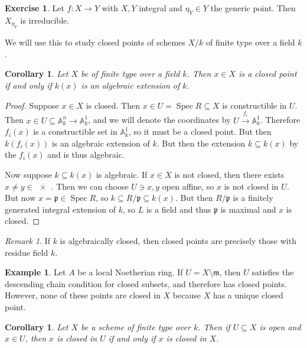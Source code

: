 \documentclass[leqno, openany]{memoir}
\newtheorem{cor}[thm]{Corollary}
\theoremstyle{definition}
\newtheorem{exm}[thm]{Example}
\newtheorem{exer}[thm]{Exercise}
\theoremstyle{remark}
\newtheorem{rmk}[thm]{Remark}
\theoremstyle{plain}
\theoremstyle{definition}
\theoremstyle{remark}
\newcommand{\A}{\mathbb{A}}
\newcommand{\mf}[1]{\mathfrak{#1}}
\newcommand{\ol}[1]{\overline{#1}}
\DeclareMathOperator{\Spec}{Spec}
\begin{document}
\begin{exer}
    Let $f \colon X \to Y$ with $X,Y$ integral and $\eta_Y \in Y$ the generic point. Then $X_{\eta_Y}$ is irreducible.
\end{exer}

We will use this to study closed points of schemes $X/k$ of finite type over a field $k$.

\begin{cor}
    Let $X$ be of finite type over a field $k$. Then $x \in X$ is a closed point if and only if $k(x)$ is an algebraic extension of $k$.
\end{cor}

\begin{proof}
    Suppose $x \in X$ is closed. Then $x \in U = \Spec R \subseteq X$ is constructible in $U$. Then $x \in U \subseteq \A^n_k \to \A^1_k$, and we will denote the coordinates by $U \xrightarrow{f_i} \A^1_k$. Therefore $f_i(x)$ is a constructible set in $\A^1_k$, so it must be a closed point. But then $k(f_i(x))$ is an algebraic extension of $k$. But then the extension $k \subseteq k(x)$ by the $f_i(x)$ and is thus algebraic.

    Now suppose $k \subseteq k(x)$ is algebraic. If $x \in X$ is not closed, then there exists $x \neq y \in \ol{\qty{x}}$. Then we can choose $U \ni x,y$ open affine, so $x$ is not closed in $U$. But now $x = \mf{p} \in \Spec R$, so $k \subseteq R/\mf{p} \subseteq k(x)$. But then $R/\mf{p}$ is a finitely generated integral extension of $k$, so $L$ is a field and thus $\mf{p}$ is maximal and $x$ is closed.
\end{proof}

\begin{rmk}
    If $k$ is algebraically closed, then closed points are precisely those with residue field $k$.
\end{rmk}

\begin{exm}
    Let $A$ be a local Noetherian ring. If $U = X \setminus \mf{m}$, then $U$ satisfies the descending chain condition for closed subsets, and therefore has closed points. However, none of these points are closed in $X$ because $X$ has a unique closed point.
\end{exm}

\begin{cor}
    Let $X$ be a scheme of finite type over $k$. Then if $U \subseteq X$ is open and $x \in U$, then $x$ is closed in $U$ if and only if $x$ is closed in $X$.
\end{cor}
\end{document}
